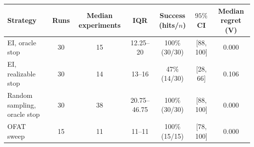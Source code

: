 \begin{tabular}{lcccccc}
\toprule
Strategy & Runs & Median experiments & IQR & Success (hits/$n$) & $95\%$ CI & Median regret (V) \\
\midrule
EI, oracle stop & 30 & 15 & 12.25--20 & 100\% (30/30) & [88, 100] & 0.000 \\
EI, realizable stop & 30 & 14 & 13--16 & 47\% (14/30) & [28, 66] & 0.106 \\
Random sampling, oracle stop & 30 & 38 & 20.75--46.75 & 100\% (30/30) & [88, 100] & 0.000 \\
OFAT sweep & 15 & 11 & 11--11 & 100\% (15/15) & [78, 100] & 0.000 \\
\bottomrule
\end{tabular}
